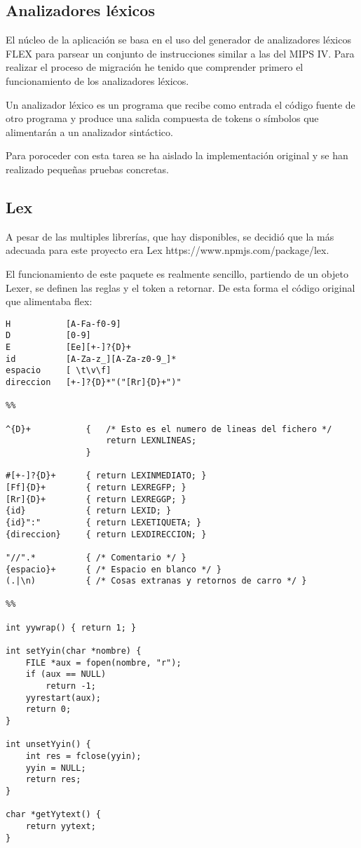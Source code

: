 \subsection{Analizadores léxicos}
El núcleo de la aplicación se basa en el uso del generador de analizadores 
léxicos FLEX para parsear un conjunto de instrucciones similar a las del MIPS IV. 
Para realizar el proceso de migración he tenido que comprender primero el 
funcionamiento de los analizadores léxicos.

\bigskip
Un analizador léxico es un programa que recibe como entrada el código fuente de 
otro programa y produce una salida compuesta de tokens o símbolos 
que alimentarán a un analizador sintáctico.

\bigskip
Para poroceder con esta tarea se ha aislado la implementación original y se han 
realizado pequeñas pruebas concretas.

\subsection{Lex}

A pesar de las multiples librerías, que hay disponibles, se decidió que la más adecuada 
para este proyecto era Lex https://www.npmjs.com/package/lex. 

El funcionamiento de este paquete es realmente sencillo, partiendo de un 
objeto Lexer, se definen las reglas y el token a retornar. De esta forma
el código original que alimentaba flex:

\begin{lstlisting}
H			[A-Fa-f0-9]
D			[0-9]
E			[Ee][+-]?{D}+
id			[A-Za-z_][A-Za-z0-9_]*
espacio		[ \t\v\f]
direccion	[+-]?{D}*"("[Rr]{D}+")"

%%

^{D}+			{	/* Esto es el numero de lineas del fichero */
					return LEXNLINEAS;
				}

#[+-]?{D}+		{ return LEXINMEDIATO; }
[Ff]{D}+		{ return LEXREGFP; }
[Rr]{D}+		{ return LEXREGGP; }
{id}			{ return LEXID; }
{id}":"			{ return LEXETIQUETA; }
{direccion}		{ return LEXDIRECCION; }

"//".*			{ /* Comentario */ }
{espacio}+		{ /* Espacio en blanco */ }
(.|\n)			{ /* Cosas extranas y retornos de carro */ }

%%

int yywrap() { return 1; }

int setYyin(char *nombre) {
	FILE *aux = fopen(nombre, "r");
	if (aux == NULL)
		return -1;
	yyrestart(aux);
	return 0;
}

int unsetYyin() {
	int res = fclose(yyin);
	yyin = NULL;
	return res;
}

char *getYytext() {
	return yytext;
}
\end{lstlisting}

